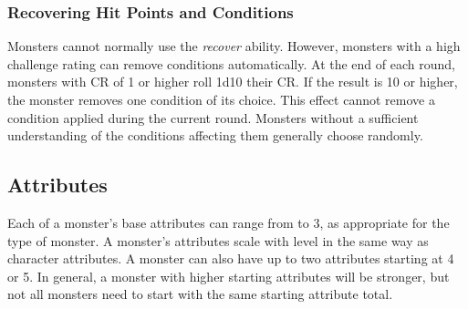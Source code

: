         \subsubsection{Recovering Hit Points and Conditions}
            Monsters cannot normally use the \textit{recover} ability.
            However, monsters with a high challenge rating can remove conditions automatically.
            At the end of each round, monsters with CR of 1 or higher roll 1d10 \add their CR.
            If the result is 10 or higher, the monster removes one condition of its choice.
            This effect cannot remove a condition applied during the current round.
            Monsters without a sufficient understanding of the conditions affecting them generally choose randomly.

    \subsection{Attributes}
        Each of a monster's base attributes can range from  to 3, as appropriate for the type of monster.
        A monster's attributes scale with level in the same way as character attributes.
        A monster can also have up to two attributes starting at 4 or 5.
        In general, a monster with higher starting attributes will be stronger, but not all monsters need to start with the same starting attribute total.


